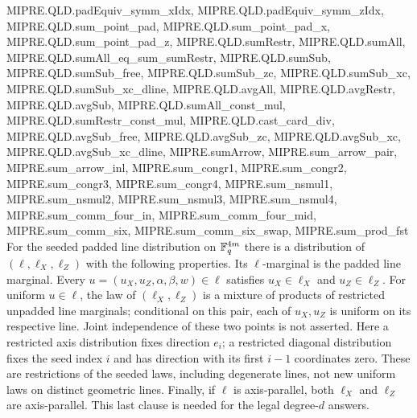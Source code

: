 \begin{lemma}
{  MIPRE.QLD.padEquiv_symm_xIdx, MIPRE.QLD.padEquiv_symm_zIdx, MIPRE.QLD.sum_point_pad,
  MIPRE.QLD.sum_point_pad_x, MIPRE.QLD.sum_point_pad_z, MIPRE.QLD.sumRestr, MIPRE.QLD.sumAll,
  MIPRE.QLD.sumAll_eq_sum_sumRestr, MIPRE.QLD.sumSub, MIPRE.QLD.sumSub_free, MIPRE.QLD.sumSub_zc,
  MIPRE.QLD.sumSub_xc, MIPRE.QLD.sumSub_xc_dline, MIPRE.QLD.avgAll, MIPRE.QLD.avgRestr,
  MIPRE.QLD.avgSub, MIPRE.QLD.sumAll_const_mul, MIPRE.QLD.sumRestr_const_mul,
  MIPRE.QLD.cast_card_div, MIPRE.QLD.avgSub_free, MIPRE.QLD.avgSub_zc, MIPRE.QLD.avgSub_xc,
  MIPRE.QLD.avgSub_xc_dline, MIPRE.sumArrow, MIPRE.sum_arrow_pair, MIPRE.sum_arrow_inl,
  MIPRE.sum_congr1, MIPRE.sum_congr2, MIPRE.sum_congr3, MIPRE.sum_congr4, MIPRE.sum_nsmul1,
  MIPRE.sum_nsmul2, MIPRE.sum_nsmul3, MIPRE.sum_nsmul4, MIPRE.sum_comm_four_in,
  MIPRE.sum_comm_four_mid, MIPRE.sum_comm_six, MIPRE.sum_comm_six_swap, MIPRE.sum_prod_fst}
\leanok
For the seeded padded line distribution on $\mathbb{F}_q^{4m}$ there is a distribution
of $(\ell,\ell_X,\ell_Z)$ with the following properties. Its $\ell$-marginal
is the padded line marginal. Every $u=(u_X,u_Z,\alpha,\beta,w)\in\ell$
satisfies $u_X\in\ell_X$ and $u_Z\in\ell_Z$. For uniform $u\in\ell$, the
law of $(\ell_X,\ell_Z)$ is a mixture of products of restricted unpadded
line marginals; conditional on this pair, each of $u_X,u_Z$ is uniform on
its respective line. Joint independence of these two points is not asserted.
Here a restricted axis distribution fixes direction $e_i$; a restricted
diagonal distribution fixes the seed index $i$ and has direction with its
first $i-1$ coordinates zero. These are restrictions of the seeded laws,
including degenerate lines, not new uniform laws on distinct geometric lines.
Finally, if $\ell$ is axis-parallel, both $\ell_X$ and $\ell_Z$ are
axis-parallel. This last clause is needed for the legal degree-$d$ answers.
\end{lemma}

